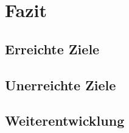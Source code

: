 \section{Fazit}
\label{sec:conclusion}

\subsection{Erreichte Ziele}

\subsection{Unerreichte Ziele}

\subsection{Weiterentwicklung}



